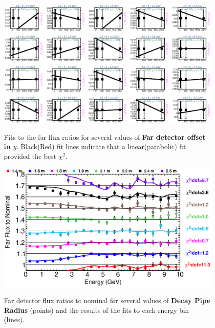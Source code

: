 {\begin{figure}[ht]
  \begin{center}
    {\includegraphics[width=5.0in]{figures/LBNEFDY_far_fits.eps}}
  \end{center}
\caption{ Fits to the far flux ratios for several values of {\bf Far detector offset in $y$}. Black(Red) fit lines indicate that a linear(parabolic) fit provided the best $\chi^2$. }
\end{figure}

\begin{figure}[ht]
  \begin{center}
    {\includegraphics[width=6.0in]{figures/DecayPipeRadius_far_summary.eps}}
  \end{center}
\caption{ Far detector flux ratios to nominal for several values of {\bf Decay Pipe Radius} (points) and the results of the fits to each energy bin (lines).}
\end{figure}

}
